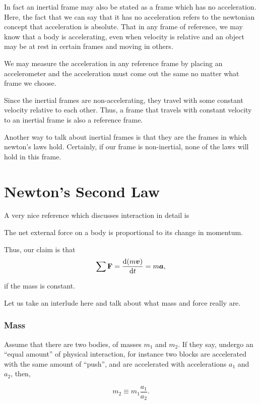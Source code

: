 In fact an inertial frame may also be stated as a frame which has no acceleration.
Here, the fact that we can say that it has no acceleration refers
to the newtonian concept that acceleration is absolute. That in any frame 
of reference, we may know that a body is accelerating, even when velocity is 
relative and an object may be at rest in certain frames and moving in others.

We may measure the acceleration in any reference frame by placing 
an accelerometer and the acceleration must come out the same no matter
what frame we choose.

Since the inertial frames are non-accelerating, they travel with some constant velocity 
relative to each other. Thus, a frame that travels with constant velocity 
to an inertial frame is also a reference frame.

Another way to talk about inertial frames is that they are the frames in which newton's laws
hold. Certainly, if our frame is non-inertial, none of the laws will hold in this frame.

\section{Newton's Second Law}

A very nice reference which discusses interaction in detail is \cite{kleppner}

\begin{axioms}
     The net external force on a body is proportional to its change in 
    momentum.
\end{axioms}

Thus, our claim is that
\[\sum \mathbf{F} = \dv{(m\boldsymbol{v})}{t} = m\boldsymbol{a},\]

if the mass is constant. 

Let us take an interlude here and talk about what mass and force really are.

\subsubsection{Mass}

Assume that there are two bodies, of masses \(m_1\) and \(m_2\).
If they say, undergo an ``equal amount'' of physical interaction,
for instance two blocks are accelerated with the same amount 
of ``push'', and are accelerated with accelerations \(a_1\) and \(a_2\),
then,

\[m_2 \equiv m_1\frac{a_1}{a_2}.\]

